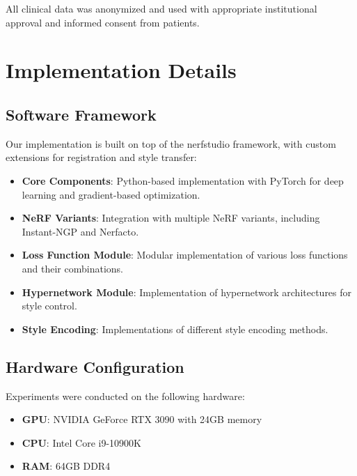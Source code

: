 All clinical data was anonymized and used with appropriate institutional approval and informed consent from patients.

\section{Implementation Details}

\subsection{Software Framework}

Our implementation is built on top of the nerfstudio framework, with custom extensions for registration and style transfer:

\begin{itemize}
    \item \textbf{Core Components}: Python-based implementation with PyTorch for deep learning and gradient-based optimization.
    
    \item \textbf{NeRF Variants}: Integration with multiple NeRF variants, including Instant-NGP \parencite{muller2022instant} and Nerfacto.
    
    \item \textbf{Loss Function Module}: Modular implementation of various loss functions and their combinations.
    
    \item \textbf{Hypernetwork Module}: Implementation of hypernetwork architectures for style control.
    
    \item \textbf{Style Encoding}: Implementations of different style encoding methods.
\end{itemize}

\subsection{Hardware Configuration}

Experiments were conducted on the following hardware:

\begin{itemize}
    \item \textbf{GPU}: NVIDIA GeForce RTX 3090 with 24GB memory
    \item \textbf{CPU}: Intel Core i9-10900K
    \item \textbf{RAM}: 64GB DDR4
\end{itemize}

